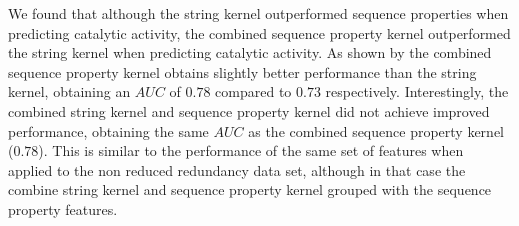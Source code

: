 We found that although the string kernel outperformed sequence properties when predicting catalytic activity, the combined sequence property kernel outperformed the string kernel when predicting catalytic activity.  As shown by  the combined sequence property kernel obtains slightly better performance than the string kernel, obtaining an $AUC$ of $0.78$ compared to $0.73$ respectively.  Interestingly, the combined string kernel and sequence property kernel did not achieve improved performance, obtaining the same $AUC$ as the combined sequence property kernel ($0.78$).  This is similar to the performance of the same set of features when applied to the non reduced redundancy data set, although in that case the combine string kernel and sequence property kernel grouped with the sequence property features.

